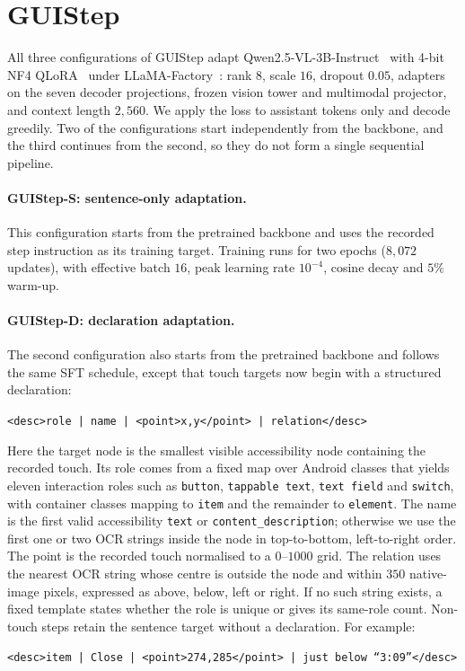 \documentclass[runningheads,a4paper]{llncs}
\begin{document}
\section{GUIStep}
\label{sec:model}

All three configurations of GUIStep adapt Qwen2.5-VL-3B-Instruct~\cite{qwen25vl} with 4-bit NF4
QLoRA~\cite{lora,qlora} under LLaMA-Factory~\cite{llamafactory}: rank $8$, scale $16$, dropout
$0.05$, adapters on the seven decoder projections, frozen vision tower and multimodal projector,
and context length $2{,}560$. We apply the loss to assistant tokens only and decode greedily.
Two of the configurations start independently from the backbone, and the third continues from the
second, so they do not form a single sequential pipeline.

\paragraph{GUIStep-S: sentence-only adaptation.}
This configuration starts from the pretrained backbone and uses the recorded step instruction as
its training target. Training runs for two epochs ($8{,}072$ updates), with effective batch $16$,
peak learning rate $10^{-4}$, cosine decay and $5\%$ warm-up.

\paragraph{GUIStep-D: declaration adaptation.}
The second configuration also starts from the pretrained backbone and follows the same SFT
schedule, except that touch targets now begin with a structured declaration:
\begin{center}
\texttt{<desc>role | name | <point>x,y</point> | relation</desc>}
\end{center}
Here the target node is the smallest visible accessibility node containing the recorded touch.
Its role comes from a fixed map over Android classes that yields eleven interaction roles such as
\texttt{button}, \texttt{tappable text}, \texttt{text field} and \texttt{switch}, with container
classes mapping to \texttt{item} and the remainder to \texttt{element}. The name is the first
valid accessibility \texttt{text} or \texttt{content\_description}; otherwise we use the first one
or two OCR strings inside the node in top-to-bottom, left-to-right order. The point is the recorded
touch normalised to a $0$--$1000$ grid. The relation uses the nearest OCR string whose centre is
outside the node and within $350$ native-image pixels, expressed as above, below, left or right.
If no such string exists, a fixed template states whether the role is unique or gives its
same-role count. Non-touch steps retain the sentence target without a declaration. For example:
\begin{center}
\texttt{<desc>item | Close | <point>274,285</point> | just below ``3:09''</desc>}
\end{center}
\end{document}

